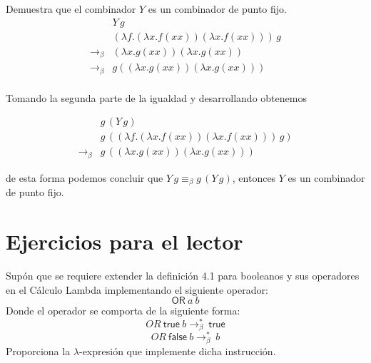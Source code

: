                     \begin{exercise} Demuestra que el combinador  $Y$ es un combinador de punto fijo.
                        \[
                            \begin{array}{cl}
                            &Y\,g\\
                            &(\lambda f.(\lambda x.f(xx))(\lambda x.f(xx)))\,g\\
                            \to_\beta&(\lambda x.g(xx))(\lambda x.g(xx))\\
                            \to_\beta&g((\lambda x.g(xx))(\lambda x.g(xx)))\\
                            \end{array}
                        \]
                    
                        Tomando la segunda parte de la igualdad y desarrollando obtenemos
                    
                        \[
                            \begin{array}{cl}
                            &g\,(Y\,g)\\
                            &g\,((\lambda f.(\lambda x.f(xx))(\lambda x.f(xx)))\,g)\\
                            \to_\beta&g\,((\lambda x.g(xx))(\lambda x.g(xx)))
                            \end{array}
                        \]
                    
                        de esta forma podemos concluir que $Y \,g\equiv_\beta g\,(Y\,g)$, entonces $Y$ es un combinador de punto fijo.
                    \end{exercise}

            \section{Ejercicios para el lector}

                \begin{exercise}
                    Supón que se requiere extender la definición 4.1 para booleanos y sus operadores en el Cálculo Lambda implementando el siguiente operador:
                    \[\textsf{OR}\ a\ b\]
		Donde el operador se comporta de la siguiente forma:
		\[OR\ \textsf{true}\ b \to_\beta^*\ \textsf{true} \]
		\[OR\ \textsf{false}\ b \to_\beta^*\ b \]
		Proporciona la $\lambda$-expresión que implemente dicha instrucción.
                \end{exercise}

